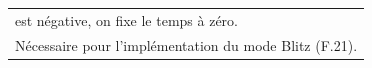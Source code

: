 \documentclass[a4paper,12pt]{article}
\begin{document}
\begin{tabularx}{\textwidth}{|X|}
    est négative, on fixe le temps à zéro.                                                                                                                                                                                                         \\
    \arrayrulecolor{MediumAquamarine}\hline \arrayrulecolor{CornflowerBlue}
    Nécessaire pour l’implémentation du mode Blitz (F.21).                                                                                                                                                                                         \\ \hline
\end{tabularx}

\vspace{1cm}

\noindent
\setlength{\arrayrulewidth}{1.5pt}
\renewcommand{\arraystretch}{1.5}
\end{document}
